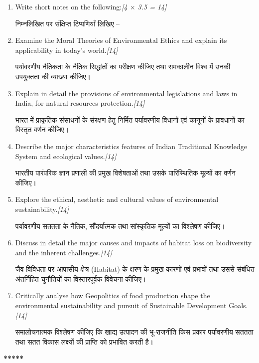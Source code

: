 \documentclass[11pt,a4paper]{article}
\newcommand{\pts}[1]{\hfill \textit{[#1]}}
\begin{document}
\begin{enumerate}[label=\textbf{\arabic*.},leftmargin=*,itemsep=14pt]

  \item Write short notes on the following:\pts{4 $\times$ 3.5 = 14}
  
  निम्नलिखित पर संक्षिप्त टिप्पणियाँ लिखिए --

  \item Examine the Moral Theories of Environmental Ethics and explain its applicability in today's world.\pts{14}
  
  पर्यावरणीय नैतिकता के नैतिक सिद्धांतों का परीक्षण कीजिए तथा समकालीन विश्व में उनकी उपयुक्तता की व्याख्या कीजिए।

  \item Explain in detail the provisions of environmental legislations and laws in India, for natural resources protection.\pts{14}
  
  भारत में प्राकृतिक संसाधनों के संरक्षण हेतु निर्मित पर्यावरणीय विधानों एवं कानूनों के प्रावधानों का विस्तृत वर्णन कीजिए।

  \item Describe the major characteristics features of Indian Traditional Knowledge System and ecological values.\pts{14}
  
  भारतीय पारंपरिक ज्ञान प्रणाली की प्रमुख विशेषताओं तथा उसके पारिस्थितिक मूल्यों का वर्णन कीजिए।

  \item Explore the ethical, aesthetic and cultural values of environmental sustainability.\pts{14}
  
  पर्यावरणीय सततता के नैतिक, सौंदर्यात्मक तथा सांस्कृतिक मूल्यों का विश्लेषण कीजिए।

  \item Discuss in detail the major causes and impacts of habitat loss on biodiversity and the inherent challenges.\pts{14}
  
  जैव विविधता पर आपासीय क्षेत्र (Habitat) के क्षरण के प्रमुख कारणों एवं प्रभावों तथा उससे संबंधित अंतर्निहित चुनौतियों का विस्तारपूर्वक विवेचना कीजिए।

  \item Critically analyse how Geopolitics of food production shape the environmental sustainability and pursuit of Sustainable Development Goals.\pts{14}
  
  समालोचनात्मक विश्लेषण कीजिए कि खाद्य उत्पादन की भू-राजनीति किस प्रकार पर्यावरणीय सततता तथा सतत विकास लक्ष्यों की प्राप्ति को प्रभावित करती है।

\end{enumerate}

\bigskip
\begin{center}
  \textbf{*****}
\end{center}
\end{document}
